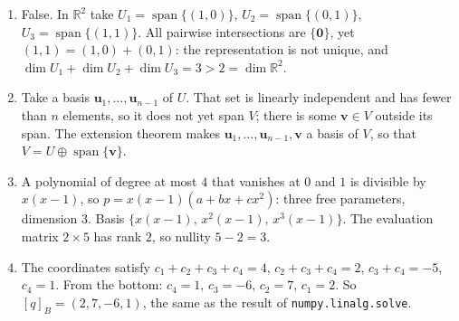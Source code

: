 \begin{enumerate}[label=\textbf{6.\arabic*}]
  \item False. In $\mathbb{R}^{2}$ take $U_{1}=\operatorname{span}\{(1,0)\}$,
        $U_{2}=\operatorname{span}\{(0,1)\}$, $U_{3}=\operatorname{span}\{(1,1)\}$.
        All pairwise intersections are $\{\mathbf{0}\}$, yet
        $(1,1)=(1,0)+(0,1)$: the representation is not unique, and
        $\dim U_{1}+\dim U_{2}+\dim U_{3}=3>2=\dim\mathbb{R}^{2}$.

  \item Take a basis $\mathbf{u}_{1},\dots,\mathbf{u}_{n-1}$ of $U$. That set is
        linearly independent and has fewer than $n$ elements, so it does not yet span
        $V$; there is some $\mathbf{v}\in V$ outside its span. The extension theorem makes
        $\mathbf{u}_{1},\dots,\mathbf{u}_{n-1},\mathbf{v}$ a basis of $V$, so that
        $V=U\oplus\operatorname{span}\{\mathbf{v}\}$.

  \item A polynomial of degree at most $4$ that vanishes at $0$ and $1$ is divisible
        by $x(x-1)$, so $p=x(x-1)(a+bx+cx^{2})$: three free parameters,
        dimension $3$. Basis $\{x(x-1),\,x^{2}(x-1),\,x^{3}(x-1)\}$. The evaluation
        matrix $2\times5$ has rank $2$, so nullity $5-2=3$.

  \item The coordinates satisfy $c_{1}+c_{2}+c_{3}+c_{4}=4$, $c_{2}+c_{3}+c_{4}=2$,
        $c_{3}+c_{4}=-5$, $c_{4}=1$. From the bottom: $c_{4}=1$, $c_{3}=-6$,
        $c_{2}=7$, $c_{1}=2$. So $[q]_{B}=(2,7,-6,1)$, the same as the result of
        \texttt{numpy.linalg.solve}.
\end{enumerate}

